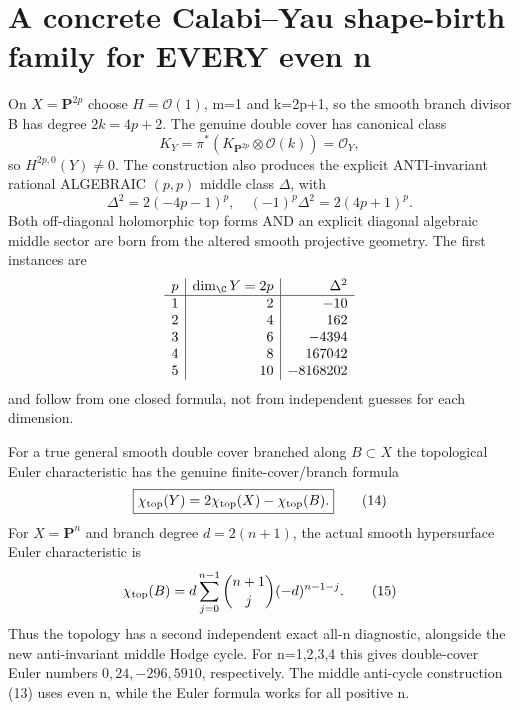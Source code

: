 \documentclass[11pt]{article}
\newcommand{\OO}{\mathcal O}
\begin{document}
\section{A concrete Calabi--Yau shape-birth family for EVERY even n}
On \(X=\mathbf P^{2p}\) choose \(H=\OO(1)\),
m=1 and k=2p+1, so the smooth branch divisor
B has degree \(2k=4p+2\). The genuine double
cover has canonical class
\[
 K_Y=\pi^*(K_{\mathbf P^{2p}}\otimes\OO(k))
     =\OO_Y,
\]
so \(H^{2p,0}(Y)\ne0\).
The construction also produces the explicit
ANTI-invariant rational ALGEBRAIC \((p,p)\)
middle class \(\Delta\), with
\[
 \boxed{
 \Delta^2=2(-4p-1)^p,\quad
 (-1)^p\Delta^2=2(4p+1)^p.
 }                                                        \tag{13}
\]
Both off-diagonal holomorphic top forms
AND an explicit diagonal algebraic
middle sector are born from the altered
smooth projective geometry.
The first instances are
\[
\begin{array}{c|r|r}
p & \dim_\C Y=2p & \Delta^2\\\hline
1&2&-10\\
2&4&162\\
3&6&-4394\\
4&8&167042\\
5&10&-8168202
\end{array}
\]
and follow from one closed formula, not
from independent guesses for each dimension.

For a true general smooth double cover
branched along \(B\subset X\) the
topological Euler characteristic has the
genuine finite-cover/branch formula
\[
 \boxed{\chi_{\rm top}(Y)
          =2\chi_{\rm top}(X)-\chi_{\rm top}(B).}
                                                               \tag{14}
\]
For \(X=\mathbf P^n\) and branch degree
\(d=2(n+1)\), the actual smooth hypersurface
Euler characteristic is
\[
 \chi_{\rm top}(B)
    =d\sum_{j=0}^{n-1}
             \binom{n+1}{j}(-d)^{n-1-j}.
                                                               \tag{15}
\]
Thus the topology has a second independent
exact all-n diagnostic, alongside the
new anti-invariant middle Hodge cycle.
For n=1,2,3,4 this gives double-cover Euler
numbers \(0,24,-296,5910\), respectively.
The middle anti-cycle construction (13)
uses even n, while the Euler formula works
for all positive n.
\end{document}
